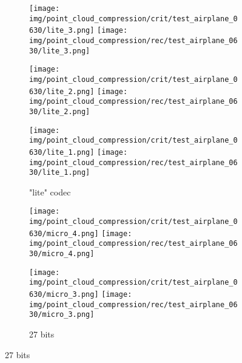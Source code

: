 \begin{figure}[t]
\begin{subfigure}[b]{\subfigureouterhspace}
\begin{subsubfigure}[b]{\subfigurehspace}
      \caption{124 bits}
      \label{fig:rec/lite/4}
    \end{subsubfigure}%
    \hfill%
    \begin{subsubfigure}[b]{\subfigurehspace}
      \centering
      \texttt{[image: img/point\_cloud\_compression/crit/test\_airplane\_0630/lite\_3.png]}
      \texttt{[image: img/point\_cloud\_compression/rec/test\_airplane\_0630/lite\_3.png]}
      \caption{36 bits}
      \label{fig:rec/lite/3}
    \end{subsubfigure}%
    \hfill%
    \begin{subsubfigure}[b]{\subfigurehspace}
      \centering
      \texttt{[image: img/point\_cloud\_compression/crit/test\_airplane\_0630/lite\_2.png]}
      \texttt{[image: img/point\_cloud\_compression/rec/test\_airplane\_0630/lite\_2.png]}
      \caption{19 bits}
      \label{fig:rec/lite/2}
    \end{subsubfigure}%
    \hfill%
    \begin{subsubfigure}[b]{\subfigurehspace}
      \centering
      \texttt{[image: img/point\_cloud\_compression/crit/test\_airplane\_0630/lite\_1.png]}
      \texttt{[image: img/point\_cloud\_compression/rec/test\_airplane\_0630/lite\_1.png]}
      \caption{13 bits}
      \label{fig:rec/lite/1}
    \end{subsubfigure}%
    \caption{"lite" codec}
  \end{subfigure}%
  \par%
  \vspace{1\baselineskip}%
  \begin{subfigure}[b]{\subfigureouterhspace}
    \setcounter{subsubfigure}{0}
    \centering
    \begin{subsubfigure}[b]{\subfigurehspace}
      \centering
      \texttt{[image: img/point\_cloud\_compression/crit/test\_airplane\_0630/micro\_4.png]}
      \texttt{[image: img/point\_cloud\_compression/rec/test\_airplane\_0630/micro\_4.png]}
      \caption{76 bits}
      \label{fig:rec/micro/4}
    \end{subsubfigure}%
    \hfill%
    \begin{subsubfigure}[b]{\subfigurehspace}
      \centering
      \texttt{[image: img/point\_cloud\_compression/crit/test\_airplane\_0630/micro\_3.png]}
      \texttt{[image: img/point\_cloud\_compression/rec/test\_airplane\_0630/micro\_3.png]}
      \caption{27 bits}
      \label{fig:rec/micro/3}
    \end{subsubfigure}%

\end{subfigure}
\end{figure}
